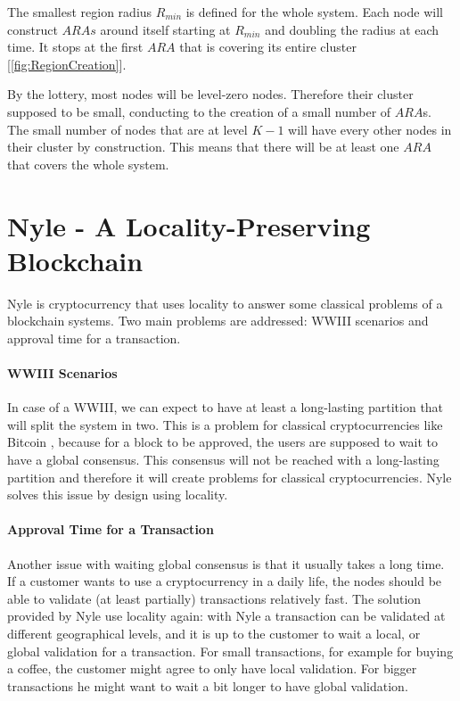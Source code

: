 \documentclass[a4paper,11pt,oneside]{report}
\begin{document}
The smallest region radius $R_{min}$ is defined for the whole system. Each node
will construct $ARAs$ around itself starting at $R_{min}$ and doubling the
radius at each time. It stops at the first $ARA$ that is covering its entire
cluster [\autoref{fig:RegionCreation}]. 

By the lottery, most nodes will be level-zero nodes. Therefore their cluster
supposed to be small, conducting to the creation of a small number of $ARA$s.
The small number of nodes that are at level $K-1$ will have every other nodes
in their cluster by construction. This means that there will be at least one
$ARA$ that covers the whole system. 

\section{Nyle - A Locality-Preserving Blockchain}

Nyle is cryptocurrency that uses locality to answer some classical problems of
a blockchain systems. Two main problems are addressed: WWIII scenarios and
approval time for a transaction.
 
\paragraph{WWIII Scenarios} \label{WWIII} In case of a WWIII, we can expect to have
at least a long-lasting partition that will split the system in two. This is a
problem for classical cryptocurrencies like Bitcoin \cite{Nakamoto2009}, because for a
block to be approved, the users are supposed to wait to have a global
consensus. This consensus will not be reached with a long-lasting partition and
therefore it will create problems for classical cryptocurrencies. Nyle solves
this issue by design using locality.

\paragraph{Approval Time for a Transaction} \label{approve_time} Another issue
with waiting global consensus is that it usually takes a long time. If a
customer wants to use a cryptocurrency in a daily life, the nodes should be 
able to validate (at least partially) transactions relatively fast. The
solution provided by Nyle use locality again: with Nyle a transaction can be
validated at different geographical levels, and it is up to the customer to wait a local, or
global validation for a transaction. For small transactions, for example for
buying a coffee, the customer might agree to only have local validation. For
bigger transactions he might want to wait a bit longer to have global
validation.
\end{document}
